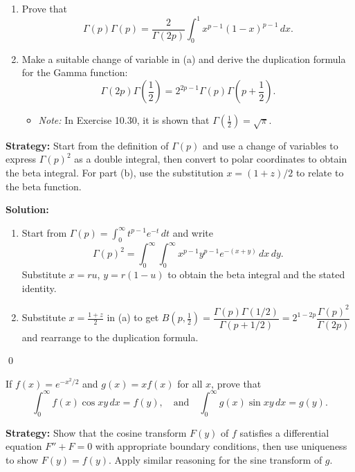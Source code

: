 \begin{problembox}
\begin{enumerate}[label=(\alph*)]
\item Prove that
\[
\Gamma(p) \Gamma(p) = \frac{2}{\Gamma(2p)} \int_0^1 x^{p-1} (1 - x)^{p-1} \, dx.
\]
\item Make a suitable change of variable in (a) and derive the duplication formula for the Gamma function:
\[
\Gamma(2p) \Gamma\left(\frac{1}{2}\right) = 2^{2p-1} \Gamma(p) \Gamma\left(p + \frac{1}{2}\right).
\]
\begin{itemize}
\item \textit{Note:} In Exercise 10.30, it is shown that $\Gamma\left(\frac{1}{2}\right) = \sqrt{\pi}$.
\end{itemize}
\end{enumerate}
\end{problembox}

\noindent\textbf{Strategy:} Start from the definition of $\Gamma(p)$ and use a change of variables to express $\Gamma(p)^2$ as a double integral, then convert to polar coordinates to obtain the beta integral. For part (b), use the substitution $x=(1+z)/2$ to relate to the beta function.

\bigskip\noindent\textbf{Solution:}
\begin{enumerate}[label=(\alph*)]
\item Start from $\Gamma(p)=\int_0^{\infty} t^{p-1}e^{-t}\,dt$ and write 
$$\Gamma(p)^2=\int_0^{\infty}\int_0^{\infty} x^{p-1}y^{p-1}e^{-(x+y)}\,dx\,dy.$$ Substitute $x=ru$, $y=r(1-u)$ to obtain the beta integral and the stated identity.
\item Substitute $x=\tfrac{1+z}{2}$ in (a) to get $B(p,\tfrac12)=\dfrac{\Gamma(p)\Gamma(1/2)}{\Gamma(p+1/2)}=2^{1-2p}\dfrac{\Gamma(p)^2}{\Gamma(2p)}$ and rearrange to the duplication formula.
\end{enumerate}\qed


\begin{problembox}
If $f(x) = e^{-x^2/2}$ and $g(x) = x f(x)$ for all $x$, prove that
\[
\int_0^\infty f(x) \cos xy \, dx = f(y), \quad \text{and} \quad \int_0^\infty g(x) \sin xy \, dx = g(y).
\]
\end{problembox}

\noindent\textbf{Strategy:} Show that the cosine transform $F(y)$ of $f$ satisfies a differential equation $F''+F=0$ with appropriate boundary conditions, then use uniqueness to show $F(y)=f(y)$. Apply similar reasoning for the sine transform of $g$.

